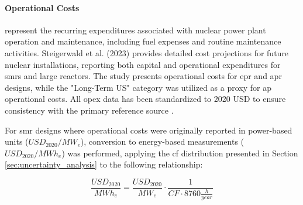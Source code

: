 \paragraph{Operational Costs} represent the recurring expenditures associated with nuclear power plant operation and maintenance, including fuel expenses and routine maintenance activities. Steigerwald et al. (2023) \cite{STEIGERWALD2023128204} provides detailed cost projections for future nuclear installations, reporting both capital and operational expenditures for \glspl{smr} and large reactors. The study presents operational costs for \gls{epr} and \gls{apr} designs, while the "Long-Term US" category was utilized as a proxy for \gls{ap} operational costs. All opex data has been standardized to 2020 USD to ensure consistency with the primary reference source \cite{STEIGERWALD2023128204}.

For \gls{smr} designs where operational costs were originally reported in power-based units ($USD_{2020}/MW_e$), conversion to energy-based measurements ($USD_{2020}/MWh_e$) was performed, applying the \gls{cf} distribution presented in Section \ref{sec:uncertainty_analysis} to the following relationship:

$$
\frac{USD_{2020}}{MWh_e} = \frac{USD_{2020}}{MW_e} \cdot \frac{1}{CF \cdot 8760 \frac{h}{year}}
$$


